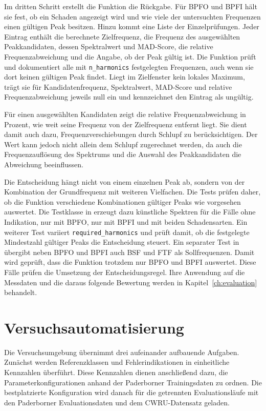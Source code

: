 Im dritten Schritt erstellt die Funktion die Rückgabe. Für BPFO und BPFI hält
sie fest, ob ein Schaden angezeigt wird und wie viele der untersuchten
Frequenzen einen gültigen Peak besitzen. Hinzu kommt eine Liste der
Einzelprüfungen. Jeder Eintrag enthält die berechnete Zielfrequenz, die Frequenz
des ausgewählten Peakkandidaten, dessen Spektralwert und MAD-Score, die relative
Frequenzabweichung und die Angabe, ob der Peak gültig ist. Die Funktion prüft
und dokumentiert alle mit \texttt{n\_harmonics} festgelegten Frequenzen, auch
wenn sie dort keinen gültigen Peak findet. Liegt im Zielfenster kein lokales
Maximum, trägt sie für Kandidatenfrequenz, Spektralwert, MAD-Score und relative
Frequenzabweichung jeweils null ein und kennzeichnet den Eintrag als ungültig.

Für einen ausgewählten Kandidaten zeigt die relative Frequenzabweichung in
Prozent, wie weit seine Frequenz von der Zielfrequenz entfernt liegt. Sie dient
damit auch dazu, Frequenzverschiebungen durch Schlupf zu berücksichtigen. Der
Wert kann jedoch nicht allein dem Schlupf zugerechnet werden, da auch die
Frequenzauflösung des Spektrums und die Auswahl des Peakkandidaten die
Abweichung beeinflussen.

Die Entscheidung hängt nicht von einem einzelnen Peak ab, sondern von der
Kombination der Grundfrequenz mit weiteren Vielfachen. Die Tests prüfen daher,
ob die Funktion verschiedene Kombinationen gültiger Peaks wie vorgesehen
auswertet. Die Testklasse in
 erzeugt dazu künstliche Spektren für die
Fälle ohne Indikation, nur mit BPFO, nur mit BPFI und mit beiden Schadensarten.
Ein weiterer Test variiert \texttt{required\_\allowbreak harmonics} und prüft damit, ob die
festgelegte Mindestzahl gültiger Peaks die Entscheidung steuert. Ein separater
Test in  übergibt neben BPFO und BPFI auch
BSF und FTF als Sollfrequenzen. Damit wird geprüft, dass die Funktion trotzdem
nur BPFO und BPFI auswertet. Diese Fälle prüfen die Umsetzung der
Entscheidungsregel. Ihre Anwendung auf die Messdaten und die daraus folgende
Bewertung werden in Kapitel~\ref{ch:evaluation} behandelt.

\section{Versuchsautomatisierung}
\label{sec:versuchsautomatisierung}


Die Versuchsumgebung übernimmt drei aufeinander aufbauende Aufgaben. Zunächst
werden Referenzklassen und Fehlerindikationen in einheitliche Kennzahlen
überführt. Diese Kennzahlen dienen anschließend dazu, die
Parameterkonfigurationen anhand der Paderborner Trainingsdaten zu ordnen. Die
bestplatzierte Konfiguration wird danach für die getrennten Evaluationsläufe
mit den Paderborner Evaluationsdaten und dem CWRU-Datensatz geladen.

